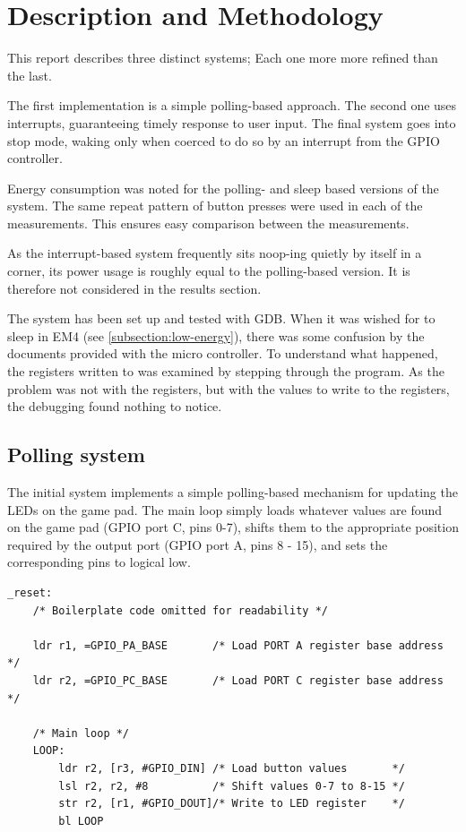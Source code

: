 \section{Description and Methodology}

This report describes three distinct systems; Each one more more refined than the last.

The first implementation is a simple polling-based approach. The second one uses interrupts, guaranteeing timely response to user input. The final system goes into stop mode, waking only when coerced to do so by an interrupt from the GPIO controller.

Energy consumption was noted for the polling- and sleep based versions of the system. The same repeat pattern of button presses were used in each of the measurements. This ensures easy comparison between the measurements.

As the interrupt-based system frequently sits noop-ing quietly by itself in a corner, its power usage is roughly equal to the polling-based version. It is therefore not considered in the results section. 

The system has been set up and tested with GDB.
When it was wished for to sleep in EM4 (see \ref{subsection:low-energy}), there was some confusion by the documents provided with the micro controller.
To understand what happened, the registers written to was examined by stepping through the program.
As the problem was not with the registers, but with the values to write to the registers, the debugging found nothing to notice.

\subsection{Polling system}
\label{subsection:polling}

The initial system implements a simple polling-based mechanism for updating the LEDs on the game pad. The main loop simply loads whatever values are found on the game pad (GPIO port C, pins 0-7), shifts them to the appropriate position required by the output port (GPIO port A, pins 8 - 15), and sets the corresponding pins to logical low.

\begin{lstlisting}[caption={Polling loop}, label={lst:polling-loop}]
_reset:
    /* Boilerplate code omitted for readability */

    ldr r1, =GPIO_PA_BASE       /* Load PORT A register base address    */
    ldr r2, =GPIO_PC_BASE       /* Load PORT C register base address    */

    /* Main loop */
    LOOP:
        ldr r2, [r3, #GPIO_DIN] /* Load button values       */
        lsl r2, r2, #8          /* Shift values 0-7 to 8-15 */
        str r2, [r1, #GPIO_DOUT]/* Write to LED register    */
        bl LOOP

\end{lstlisting}

